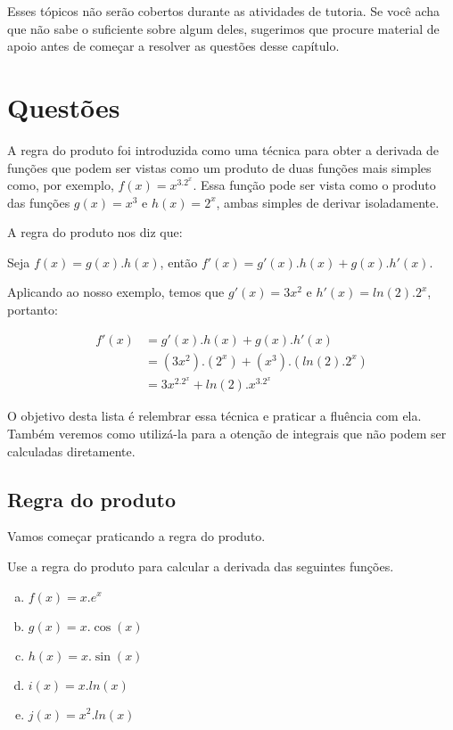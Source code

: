 \documentclass[main_estudante.tex]{subfiles}
\begin{document}
Esses tópicos não serão cobertos durante as atividades de tutoria. Se você acha que não sabe o suficiente sobre algum deles, sugerimos que procure material de apoio antes de começar a resolver as questões desse capítulo.

\newpage

\section{Questões}

A regra do produto foi introduzida como uma técnica para obter a derivada de funções que podem ser vistas como um produto de duas funções mais simples como, por exemplo, $f(x)=x^3.2^x$. Essa função pode ser vista como o produto das funções $g(x)=x^3$ e $h(x)=2^x$, ambas simples de derivar isoladamente.

A regra do produto nos diz que:

\begin{shaded*}
Seja $f(x)=g(x).h(x)$, então $f'(x)=g'(x).h(x)+g(x).h'(x)$.
\end{shaded*}

Aplicando ao nosso exemplo, temos que $g'(x)=3x^2$ e $h'(x)=ln(2).2^x$, portanto:

\begin{align*}
f'(x) &= g'(x).h(x)+g(x).h'(x) \\
 &= (3x^2) . (2^x) + (x^3) . (ln(2).2^x) \\
 &= 3x^2.2^x + ln(2).x^3.2^x
\end{align*}

O objetivo desta lista é relembrar essa técnica e praticar a fluência com ela. Também veremos como utilizá-la para a otenção de integrais que não podem ser calculadas diretamente.

\subsection*{Regra do produto}

Vamos começar praticando a regra do produto.

\begin{questao}
Use a regra do produto para calcular a derivada das seguintes funções.
\begin{enumerate}[a)]
\item $f(x)=x . e^x$
\item $g(x)=x . \cos(x)$
\item $h(x)=x . \sin(x)$
\item $i(x)=x. ln(x)$
\item $j(x)=x^2 . ln(x)$
\end{enumerate}
\end{questao}
\end{document}
